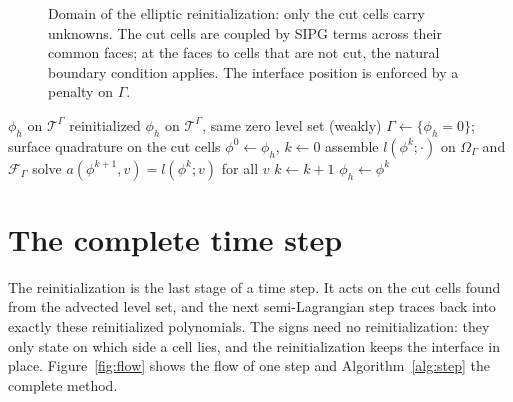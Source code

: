 \documentclass[11pt,a4paper]{article}
\newcommand{\T}{\mathcal{T}}
\begin{document}
\begin{figure}[ht]
\begin{tikzpicture}[scale=0.62]
  \end{tikzpicture}
  \hspace{0.6cm}
  \caption{Domain of the elliptic reinitialization: only the cut cells carry unknowns. The cut cells
  are coupled by SIPG terms across their common faces; at the faces to cells that are not cut, the
  natural boundary condition applies. The interface position is enforced by a penalty on $\Gamma$.}
  \label{fig:reinit}
\end{figure}

\begin{algorithm}[ht]
  \caption{Elliptic reinitialization on the cut cells}
  \label{alg:reinit}
  \begin{algorithmic}[1]
    \Require $\phi_h$ on $\T^{\Gamma}$
    \Ensure reinitialized $\phi_h$ on $\T^{\Gamma}$, same zero level set (weakly)
    \State $\Gamma \gets \{\phi_h = 0\}$; surface quadrature on the cut cells
    \State $\phi^0 \gets \phi_h$, \quad $k \gets 0$
    \Repeat
      \State assemble $l(\phi^k; \cdot)$ on $\Omega_\Gamma$ and $\mathcal{F}_\Gamma$
      \State solve $a(\phi^{k+1}, v) = l(\phi^k; v)$ for all $v$ 
      \State $k \gets k + 1$
    \State $\phi_h \gets \phi^{k}$
  \end{algorithmic}
\end{algorithm}

\FloatBarrier
\section{The complete time step}
\label{sec:step}

The reinitialization is the last stage of a time step. It acts on the cut cells found from the
advected level set, and the next semi-Lagrangian step traces back into exactly these reinitialized
polynomials. The signs need no reinitialization: they only state on which side a cell lies, and the
reinitialization keeps the interface in place. Figure~\ref{fig:flow} shows the flow of one step and
Algorithm~\ref{alg:step} the complete method.
\end{document}
